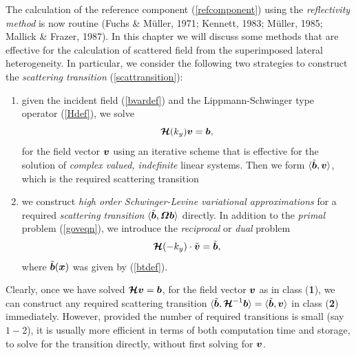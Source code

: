 



The calculation of the reference component (\ref{refcomponent}) using the 
{\em reflectivity method\/} is now 
routine (Fuchs \& M\"{u}ller, 1971; Kennett, 1983; M\"{u}ller, 1985; 
Mallick \& Frazer, 
1987). In this chapter we will discuss some methods that are effective 
for the calculation of scattered field from the superimposed lateral 
heterogeneity. 
In particular, we consider the following  two strategies to construct the 
{\em scattering 
transition\/} (\ref{scattransition}):
\begin{enumerate}
\item given the incident field (\ref{bvardef}) and the Lippmann-Schwinger 
type operator (\ref{Hdef}), we solve 
\begin{equation} \label{goveqn}
{\mbox{\boldmath$\cal H$\unboldmath}}(k_y){\mbox{\boldmath$\mit v$\unboldmath}} = {\mbox{\boldmath$\mit b$\unboldmath}},
\end{equation}
for the field vector ${\mbox{\boldmath$\mit v$\unboldmath}}$ 
using an iterative scheme that is effective for the solution of 
{\em complex valued, indefinite\/} linear systems. Then we form
$\langle \tilde{\mbox{\boldmath$\mit b$\unboldmath}}, {\mbox{\boldmath$\mit v$\unboldmath}} \rangle$, which is the required 
scattering transition


\item we construct {\em high order Schwinger-Levine variational 
approximations\/} for a 
required {\em scattering transition\/} $\langle \tilde{\mbox{\boldmath$\mit b$\unboldmath}}, {\mbox{\boldmath$\mit \Omega$\unboldmath}} {\mbox{\boldmath$\mit b$\unboldmath}} \rangle$
directly. In addition to the {\em primal \/} problem (\ref{goveqn}), 
we introduce the {\em reciprocal\/} or {\em dual\/} problem
\begin{equation} \label{goveqnT}
{\mbox{\boldmath$\cal H$\unboldmath}}(-k_y) \cdot \tilde{\mbox{\boldmath$\mit v$\unboldmath}} =\tilde{\mbox{\boldmath$\mit b$\unboldmath}},
\end{equation}
where $\tilde{\mbox{\boldmath$\mit b$\unboldmath}}({\mbox{\boldmath$\mit x$\unboldmath}})$ was given by (\ref{btdef}).

\end{enumerate}

Clearly, once we have solved ${\mbox{\boldmath$\cal H$\unboldmath}}{\mbox{\boldmath$\mit v$\unboldmath}} = {\mbox{\boldmath$\mit b$\unboldmath}}$, for the field 
vector ${\mbox{\boldmath$\mit v$\unboldmath}}$
as in class ({\bf 1}), we can construct any required scattering 
transition  
$\langle \tilde{\mbox{\boldmath$\mit b$\unboldmath}},{\mbox{\boldmath$\cal H$\unboldmath}}^{-1} {\mbox{\boldmath$\mit b$\unboldmath}}\rangle=
\langle \tilde{\mbox{\boldmath$\mit b$\unboldmath}}, {\mbox{\boldmath$\mit v$\unboldmath}}\rangle$ in class ({\bf 2}) immediately. 
However, provided the number of required transitions is small (say 
$1-2$), it is usually more efficient in terms of both computation time and 
storage, to solve for the transition directly, without first solving for 
$\mbox{\boldmath$\mit v$\unboldmath}$. 

